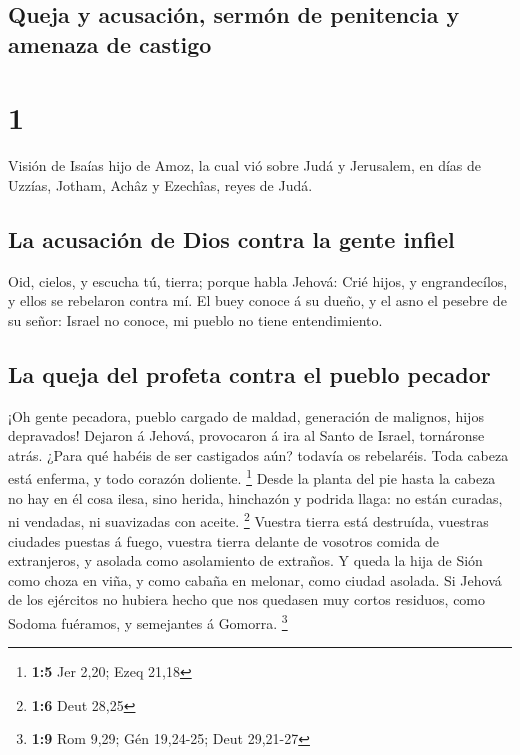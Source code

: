 \hypertarget{queja-y-acusaciuxf3n-sermuxf3n-de-penitencia-y-amenaza-de-castigo}{%
\subsection{Queja y acusación, sermón de penitencia y amenaza de
castigo}\label{queja-y-acusaciuxf3n-sermuxf3n-de-penitencia-y-amenaza-de-castigo}}

\hypertarget{section}{%
\section{1}\label{section}}

 Visión de Isaías hijo de Amoz, la cual vió sobre Judá y
Jerusalem, en días de Uzzías, Jotham, Achâz y Ezechîas, reyes de Judá.

\hypertarget{la-acusaciuxf3n-de-dios-contra-la-gente-infiel}{%
\subsection{La acusación de Dios contra la gente
infiel}\label{la-acusaciuxf3n-de-dios-contra-la-gente-infiel}}

 Oid, cielos, y escucha tú, tierra; porque habla Jehová:
Crié hijos, y engrandecílos, y ellos se rebelaron contra mí.
 El buey conoce á su dueño, y el asno el pesebre de su
señor: Israel no conoce, mi pueblo no tiene entendimiento.

\hypertarget{la-queja-del-profeta-contra-el-pueblo-pecador}{%
\subsection{La queja del profeta contra el pueblo
pecador}\label{la-queja-del-profeta-contra-el-pueblo-pecador}}

 ¡Oh gente pecadora, pueblo cargado de maldad, generación
de malignos, hijos depravados! Dejaron á Jehová, provocaron á ira al
Santo de Israel, tornáronse atrás.  ¿Para qué habéis de
ser castigados aún? todavía os rebelaréis. Toda cabeza está enferma, y
todo corazón doliente. \footnote{\textbf{1:5} Jer 2,20; Ezeq 21,18}
 Desde la planta del pie hasta la cabeza no hay en él cosa
ilesa, sino herida, hinchazón y podrida llaga: no están curadas, ni
vendadas, ni suavizadas con aceite. \footnote{\textbf{1:6} Deut 28,25}
 Vuestra tierra está destruída, vuestras ciudades puestas
á fuego, vuestra tierra delante de vosotros comida de extranjeros, y
asolada como asolamiento de extraños.  Y queda la hija de
Sión como choza en viña, y como cabaña en melonar, como ciudad asolada.
 Si Jehová de los ejércitos no hubiera hecho que nos
quedasen muy cortos residuos, como Sodoma fuéramos, y semejantes á
Gomorra. \footnote{\textbf{1:9} Rom 9,29; Gén 19,24-25; Deut 29,21-27}

